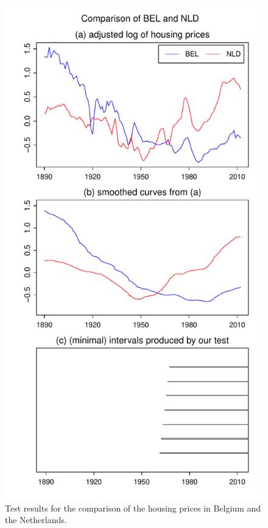 \documentclass[a4paper,12pt]{article}
\begin{document}
\begin{figure}[t!]
\begin{minipage}[t]{0.49\textwidth}
\includegraphics[width=\textwidth]{Plots/hp_BEL_vs_NLD}
\caption{Test results for the comparison of the housing prices in Belgium and the Netherlands.}\label{fig:hp:Belgium:Netherlands}
\end{minipage}

\end{figure}
\end{document}
